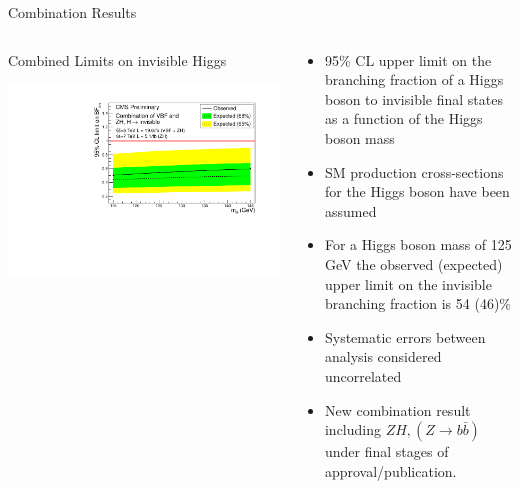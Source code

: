 \documentclass[8pt]{beamer}
\begin{document}
\begin{frame}{Combination Results}
  
\begin{columns}
 
\begin{block}{Combined Limits on invisible Higgs}
 
\centering
\includegraphics[width=\linewidth]{img/invlimitfinal.pdf} 

\end{block}

\begin{block}

\begin{itemize}
 \item 95\% CL upper limit on the branching fraction of a Higgs boson to invisible final states as a function of the Higgs boson mass
 \item SM production cross-sections for the Higgs boson have been assumed
 \item For a Higgs boson mass of 125 GeV the observed (expected) upper limit on the invisible branching fraction is 54 (46)\%
 \item Systematic errors between analysis considered uncorrelated
 \item New combination result including $ZH, (Z \rightarrow b\bar{b})$ under final stages of approval/publication. 
\end{itemize}
 
\end{block}

\end{columns}
 
\end{frame}
\end{document}
